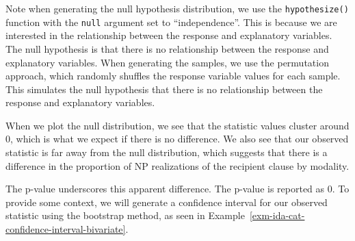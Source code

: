 \documentclass[
  letterpaper,
  DIV=11,
  numbers=noendperiod]{scrreprt}
\theoremstyle{definition}
\theoremstyle{remark}
\begin{document}
Note when generating the null hypothesis distribution, we use the
\texttt{hypothesize()} function with the \texttt{null} argument set to
``independence''. This is because we are interested in the relationship
between the response and explanatory variables. The null hypothesis is
that there is no relationship between the response and explanatory
variables. When generating the samples, we use the permutation approach,
which randomly shuffles the response variable values for each sample.
This simulates the null hypothesis that there is no relationship between
the response and explanatory variables.

When we plot the null distribution, we see that the statistic values
cluster around \(0\), which is what we expect if there is no difference.
We also see that our observed statistic is far away from the null
distribution, which suggests that there is a difference in the
proportion of NP realizations of the recipient clause by modality.

The p-value underscores this apparent difference. The p-value is
reported as \(0\). To provide some context, we will generate a
confidence interval for our observed statistic using the bootstrap
method, as seen in
Example~\ref{exm-ida-cat-confidence-interval-bivariate}.
\end{document}
